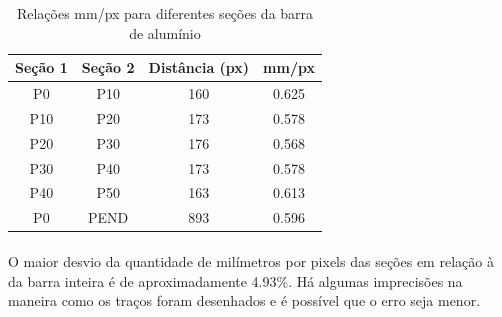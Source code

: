 \documentclass[a4paper,11pt]{scrartcl} %
\numberwithin{equation}{section} %
\numberwithin{figure}{section} %
\numberwithin{table}{section} %
\begin{document}
\begin{table}[!ht]
\centering
\caption{Relações mm/px para diferentes seções da barra de alumínio \label{relacoesmmpx}}
	\begin{tabular}{|c|c|c|c|}
	\hline
		Seção 1 & Seção 2 & Distância (px) & mm/px\\ \hline
		P0 & P10 & 160 & 0.625\\ \hline
		P10 & P20 & 173 & 0.578\\ \hline
		P20 & P30 & 176 & 0.568\\ \hline
		P30 & P40 & 173 & 0.578\\ \hline
		P40 & P50 & 163 & 0.613\\ \hline
		P0 & PEND & 893 & 0.596\\ \hline
	\end{tabular}
\end{table}

\paragraph{} O maior desvio da quantidade de milímetros por pixels das seções em relação à da barra inteira é de aproximadamente 4.93\%. Há algumas imprecisões na maneira como os traços foram desenhados e é possível que o erro seja menor.
\end{document}
